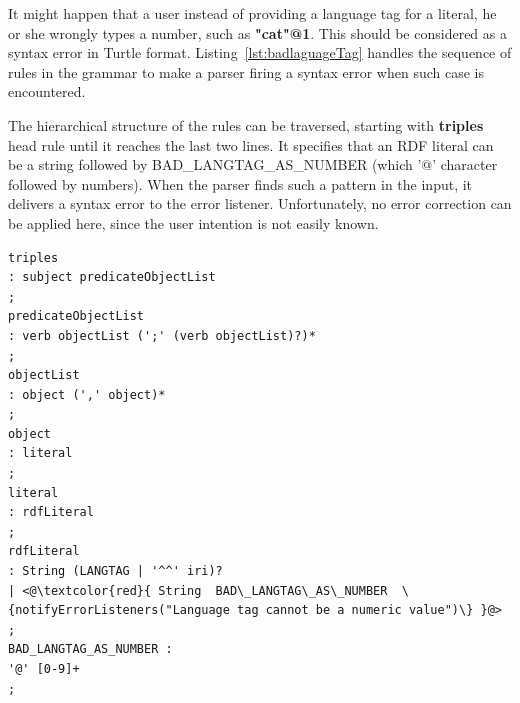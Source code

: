 \begin{enumerate}
It might happen that a user instead of providing a language tag for a literal, he or she wrongly types a number, such as \textbf{"cat"@1}.
This should be considered as a syntax error in Turtle format. 
Listing~\ref{lst:badlaguageTag} handles the sequence of rules in the grammar to make a parser firing a syntax error when such case is encountered. 

The hierarchical structure of the rules can be traversed, starting with \textbf{triples} head rule until it reaches the last two lines.
It specifies that an RDF literal can be a string followed by BAD\_LANGTAG\_AS\_NUMBER (which '@' character followed by numbers). 
When the parser finds such a pattern in the input, it delivers a syntax error to the error listener. 
Unfortunately, no error correction can be applied here, since the user intention is not easily known.  

\begin{lstlisting}[label=lst:badlaguageTag,  caption={Starting rules in the grammar file8}] 
triples
: subject predicateObjectList
;
predicateObjectList
: verb objectList (';' (verb objectList)?)*
;
objectList
: object (',' object)*
;
object
: literal
;
literal
: rdfLiteral
;
rdfLiteral
: String (LANGTAG | '^^' iri)?
| <@\textcolor{red}{ String  BAD\_LANGTAG\_AS\_NUMBER  \{notifyErrorListeners("Language tag cannot be a numeric value")\} }@>
;
BAD_LANGTAG_AS_NUMBER : 
'@' [0-9]+
;
\end{lstlisting}
\end{enumerate}
